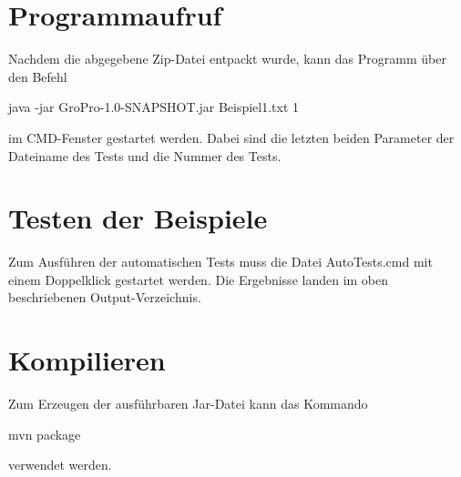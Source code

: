 \section{Programmaufruf}\label{sec:programmaufruf}
Nachdem die abgegebene Zip-Datei entpackt wurde, kann das Programm über den Befehl
\begin{center}
    \colorbox{gray!20}{
        \begin{minipage}{0.9\textwidth}
            java -jar GroPro-1.0-SNAPSHOT.jar Beispiel1.txt 1
        \end{minipage}
    }
\end{center}
im CMD-Fenster gestartet werden.
Dabei sind die letzten beiden Parameter der Dateiname des Tests und die Nummer des Tests.

\section{Testen der Beispiele}\label{sec:testen-der-beispiele}
Zum Ausführen der automatischen Tests muss die Datei \glqq AutoTests.cmd \grqq{} mit einem Doppelklick gestartet werden.
Die Ergebnisse landen im oben beschriebenen Output-Verzeichnis.

\section{Kompilieren}\label{sec:kompilieren}
Zum Erzeugen der ausführbaren Jar-Datei kann das Kommando
\begin{center}
    \colorbox{gray!20}{
        \begin{minipage}{0.9\textwidth}
            mvn package
        \end{minipage}
    }
\end{center}
verwendet werden.

